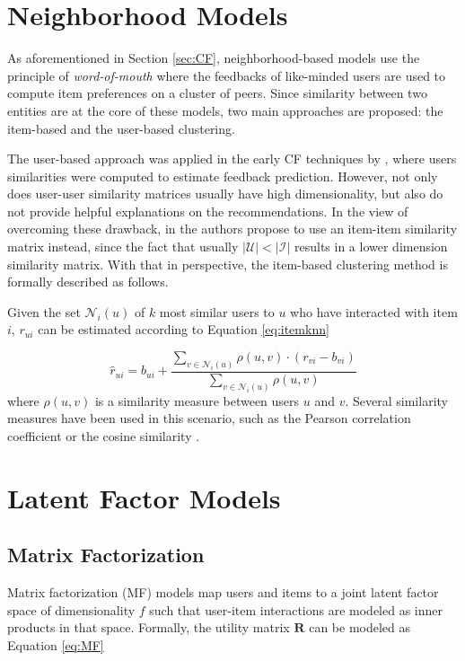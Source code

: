 

\section{Neighborhood Models}

As aforementioned in Section \ref{sec:CF}, neighborhood-based models use the principle of \textit{word-of-mouth} where the feedbacks of like-minded users are used to compute item preferences on a cluster of peers. Since similarity between two entities are at the core of these models, two main approaches are proposed: the item-based and the user-based clustering.

The user-based approach was applied in the early CF techniques by \cite{1999AlgorithmicFramework}, where users similarities were computed to estimate feedback prediction. However, not only does user-user similarity matrices usually have high dimensionality, but also do not provide helpful explanations on the recommendations. In the view of overcoming these drawback, in \cite{2001sarwar} the authors propose to use an item-item similarity matrix instead, since the fact that usually $|\mathcal{U}| < |\mathcal{I}|$ results in a lower dimension similarity matrix. With that in perspective, the item-based clustering method is formally described as follows.

Given the set $\mathcal{N}_i(u)$ of $k$ most similar users to $u$ who have interacted with item $i$, $r_{ui}$ can be estimated according to Equation \ref{eq:itemknn}

\begin{equation} 
    \label{eq:itemknn}
    \hat{r}_{ui} = b_{ui} + \frac{\sum_{v \in \mathcal{N}_i(u)} \rho(u,v)\cdot (r_{vi}-b_{vi})}{\sum_{v \in \mathcal{N}_i(u)} \rho(u,v)}
\end{equation} where $\rho(u,v)$ is a similarity measure between users $u$ and $v$. Several similarity measures have been used in this scenario, such as the Pearson correlation coefficient or the cosine similarity \cite{2010Handbook}.

\section{Latent Factor Models}


\subsection{Matrix Factorization}

    Matrix factorization (MF)  models map users and items to a joint latent factor space of dimensionality $f$ such that user-item interactions are modeled as inner products in that space. Formally, the utility matrix $\mathbf{R}$ can be modeled as Equation \ref{eq:MF}
    
